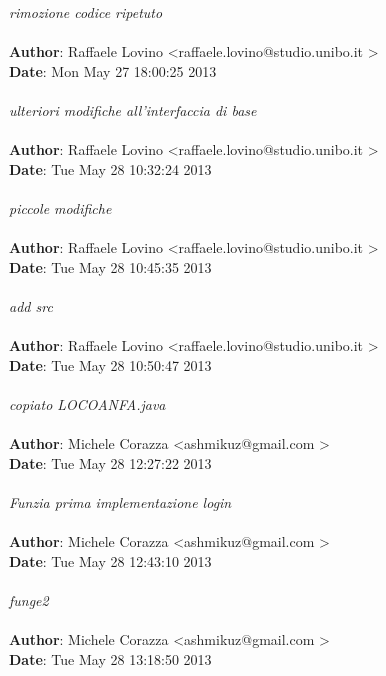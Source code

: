 \documentclass[a4paper,12pt]{article} %
\begin{document}
    \emph{rimozione codice ripetuto}\\
\\
\textbf{Author}: Raffaele Lovino \textless raffaele.lovino@studio.unibo.it \textgreater \\
\textbf{Date}:   Mon May 27 18:00:25 2013 \\
\\
    \emph{ulteriori modifiche all'interfaccia di base}\\
\\
\textbf{Author}: Raffaele Lovino \textless raffaele.lovino@studio.unibo.it \textgreater \\
\textbf{Date}:   Tue May 28 10:32:24 2013 \\
\\
    \emph{piccole modifiche}\\
\\
\textbf{Author}: Raffaele Lovino \textless raffaele.lovino@studio.unibo.it \textgreater \\
\textbf{Date}:   Tue May 28 10:45:35 2013 \\
\\
    \emph{add src}\\
\\
\textbf{Author}: Raffaele Lovino \textless raffaele.lovino@studio.unibo.it \textgreater \\
\textbf{Date}:   Tue May 28 10:50:47 2013 \\
\\
    \emph{copiato LOCOANFA.java}\\
\\
\textbf{Author}: Michele Corazza \textless ashmikuz@gmail.com \textgreater \\
\textbf{Date}:   Tue May 28 12:27:22 2013 \\
\\
    \emph{Funzia prima implementazione login}\\
\\
\textbf{Author}: Michele Corazza \textless ashmikuz@gmail.com \textgreater \\
\textbf{Date}:   Tue May 28 12:43:10 2013 \\
\\
    \emph{funge2}\\
\\
\textbf{Author}: Michele Corazza \textless ashmikuz@gmail.com \textgreater \\
\textbf{Date}:   Tue May 28 13:18:50 2013 \\
\\
\end{document}
